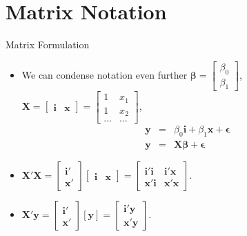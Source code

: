 \documentclass[aspectratio=169, handout]{beamer}
\numberwithin{equation}{section}
\begin{document}
\section{Matrix Notation}
\begin{frame}{Matrix Formulation}
\begin{itemize}
\item We can condense notation even further $\bm{\beta}=\begin{bmatrix}\beta_0 \\ \beta_1\end{bmatrix}$, $\bm{X}=\begin{bmatrix} \bm{i} &\bm{x}\end{bmatrix}=\begin{bmatrix} 1 &x_1\\1 &x_2\\ \ldots&\ldots \end{bmatrix}$, 
\begin{eqnarray*}
\bm{y}&=&\beta_0\bm{i}+\beta_1\bm{x}+\bm{\epsilon}\\
\bm{y}&=&\bm{X}\bm{\beta}+\bm{\epsilon}
\end{eqnarray*}
\item $\bm{X'X}=\begin{bmatrix} \bm{i}' \\\bm{x'}\end{bmatrix}\begin{bmatrix} \bm{i} &\bm{x}\end{bmatrix} = \begin{bmatrix} \bm{i'i}&\bm{i'x}\\\bm{x'i}&\bm{x'x}\end{bmatrix}$.
\item $\bm{X'y}=\begin{bmatrix} \bm{i}' \\\bm{x'}\end{bmatrix} [\bm{y}]=\begin{bmatrix} \bm{i'y} \\\bm{x'y}\end{bmatrix}$.
\end{itemize}
\end{frame}
\end{document}
